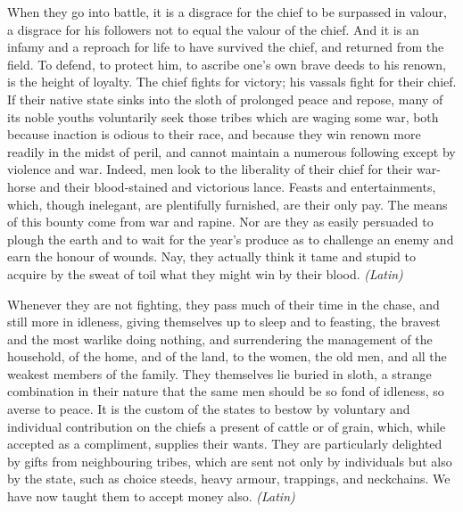 
When they go into battle, it is a disgrace for the chief to be surpassed in valour, a disgrace for his followers not to equal the valour of the chief. And it is an infamy and a reproach for life to have survived the chief, and returned from the field. To defend, to protect him, to ascribe one's own brave deeds to his renown, is the height of loyalty. The chief fights for victory; his vassals fight for their chief. If their native state sinks into the sloth of prolonged peace and repose, many of its noble youths voluntarily seek those tribes which are waging some war, both because inaction is odious to their race, and because they win renown more readily in the midst of peril, and cannot maintain a numerous following except by violence and war. Indeed, men look to the liberality of their chief for their war-horse and their blood-stained and victorious lance. Feasts and entertainments, which, though inelegant, are plentifully furnished, are their only pay. The means of this bounty come from war and rapine. Nor are they as easily persuaded to plough the earth and to wait for the year's produce as to challenge an enemy and earn the honour of wounds. Nay, they actually think it tame and stupid to acquire by the sweat of toil what they might win by their blood. \emph{(Latin)}


Whenever they are not fighting, they pass much of their time in the chase, and still more in idleness, giving themselves up to sleep and to feasting, the bravest and the most warlike doing nothing, and surrendering the management of the household, of the home, and of the land, to the women, the old men, and all the weakest members of the family. They themselves lie buried in sloth, a strange combination in their nature that the same men should be so fond of idleness, so averse to peace. It is the custom of the states to bestow by voluntary and individual contribution on the chiefs a present of cattle or of grain, which, while accepted as a compliment, supplies their wants. They are particularly delighted by gifts from neighbouring tribes, which are sent not only by individuals but also by the state, such as choice steeds, heavy armour, trappings, and neckchains. We have now taught them to accept money also. \emph{(Latin)}


